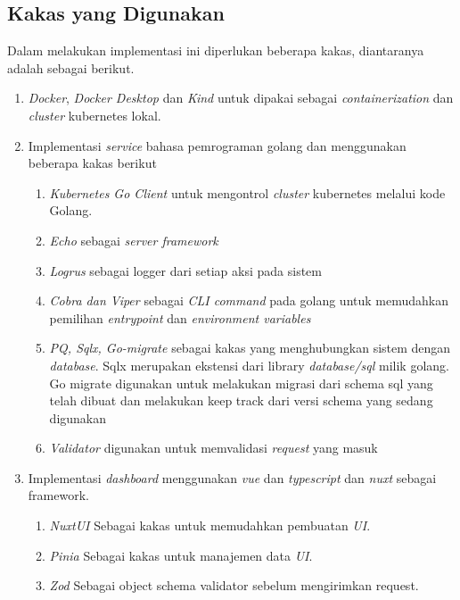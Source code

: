 \subsection{Kakas yang Digunakan}
Dalam melakukan implementasi ini diperlukan beberapa kakas, diantaranya adalah sebagai berikut.
\begin{enumerate}
  \item \textit{Docker}, \textit{Docker Desktop} dan \textit{Kind} untuk dipakai sebagai \textit{containerization} dan \textit{cluster} kubernetes lokal.
  \item Implementasi \textit{service} bahasa pemrograman golang dan menggunakan beberapa kakas berikut
        \begin{enumerate}
          \item \textit{Kubernetes Go Client} untuk mengontrol \textit{cluster} kubernetes melalui kode Golang.
          \item \textit{Echo} sebagai \textit{server framework}
          \item \textit{Logrus} sebagai logger dari setiap aksi pada sistem
          \item \textit{Cobra dan Viper} sebagai \textit{CLI command} pada golang untuk memudahkan pemilihan \textit{entrypoint} dan \textit{environment variables}
          \item \textit{PQ, Sqlx, Go-migrate} sebagai kakas yang menghubungkan sistem dengan \textit{database}. Sqlx merupakan ekstensi dari library \textit{database/sql} milik golang. Go migrate digunakan untuk melakukan migrasi dari schema sql yang telah dibuat dan melakukan keep track dari versi schema yang sedang digunakan
          \item \textit{Validator} digunakan untuk memvalidasi \textit{request} yang masuk
        \end{enumerate}

  \item Implementasi \textit{dashboard} menggunakan \textit{vue} dan \textit{typescript} dan \textit{nuxt} sebagai framework.
        \begin{enumerate}
          \item \textit{NuxtUI} Sebagai kakas untuk memudahkan pembuatan \textit{UI}.
          \item \textit{Pinia} Sebagai kakas untuk manajemen data \textit{UI}.
          \item \textit{Zod} Sebagai object schema validator sebelum mengirimkan request.
        \end{enumerate}
\end{enumerate}